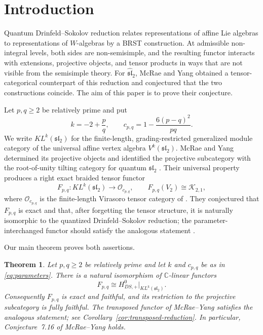 \documentclass[12pt,leqno]{amsart}
\numberwithin{equation}{section}
\newtheorem{thm}{Theorem}[section]
\newcommand{\KL}{KL}
\newcommand{\Oc}{\mathcal O}
\newcommand{\Kac}{\mathcal K}
\def\C{\mathbb{C}}
\begin{document}
\maketitle

\section{Introduction}

Quantum Drinfeld--Sokolov reduction relates representations of affine Lie
algebras to representations of $W$-algebras by a BRST construction.  At
admissible non-integral levels, both sides are non-semisimple, and the
resulting functor interacts with extensions, projective objects, and tensor
products in ways that are not visible from the semisimple theory.  For
$\widehat{\mathfrak{sl}}_2$, McRae and Yang obtained a tensor-categorical
counterpart of this reduction and conjectured that the two constructions
coincide.  The aim of this paper is to prove their conjecture.

Let $p,q\geq2$ be relatively prime and put
\begin{equation}\label{eq:parameters}
 k=-2+\frac pq,
 \qquad
 c_{p,q}=1-\frac{6(p-q)^2}{pq}.
\end{equation}
We write $\KL^k(\mathfrak{sl}_2)$ for the finite-length,
grading-restricted generalized module category of the universal affine
vertex algebra $V^k(\mathfrak{sl}_2)$.  McRae and Yang determined its
projective objects and identified the projective subcategory with the
root-of-unity tilting category for quantum $\mathfrak{sl}_2$
\cite{McRaeYang}.  Their universal property produces a right exact braided
tensor functor
\begin{equation}\label{eq:F-intro}
 F_{p,q}:\KL^k(\mathfrak{sl}_2)\longrightarrow\Oc_{c_{p,q}},
 \qquad F_{p,q}(V_2)\cong\Kac_{2,1},
\end{equation}
where $\Oc_{c_{p,q}}$ is the finite-length Virasoro tensor category of
\cite{McRaeSopin}.  They conjectured that $F_{p,q}$ is exact and that,
after forgetting the tensor structure, it is naturally isomorphic to the
quantized Drinfeld--Sokolov reduction; the parameter-interchanged functor
should satisfy the analogous statement
\cite[Conjecture~7.16]{McRaeYang}.

Our main theorem proves both assertions.

\begin{thm}\label{thm:main}
Let $p,q\geq2$ be relatively prime and let $k$ and $c_{p,q}$ be as in
\eqref{eq:parameters}.  There is a natural isomorphism of $\C$-linear
functors
\[
 F_{p,q}\cong H^0_{DS,+}\big|_{\KL^k(\mathfrak{sl}_2)}.
\]
Consequently $F_{p,q}$ is exact and faithful, and its restriction to the
projective subcategory is fully faithful.  The transposed functor of
McRae--Yang satisfies the analogous statement; see
Corollary~\ref{cor:transposed-reduction}.  In particular,
Conjecture~7.16 of McRae--Yang holds.
\end{thm}
\end{document}
